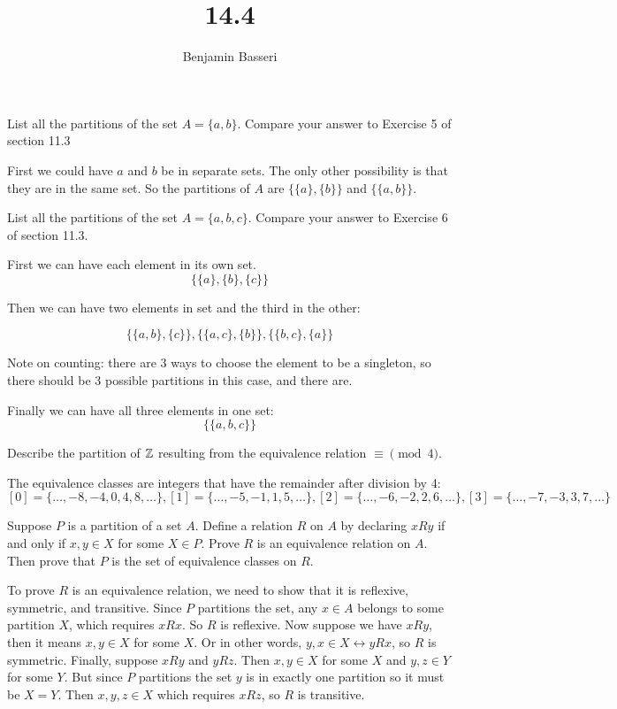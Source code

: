 \documentclass{article}
\title{14.4}
\author{Benjamin Basseri}
\date{} %
\begin{document}
\maketitle

\begin{problem}
List all the partitions of the set $A = \{a, b\}$. Compare your answer to Exercise 5 of section 11.3
\end{problem}

First we could have $a$ and $b$ be in separate sets. The only other possibility is that they are in the same set. So the partitions of $A$ are $\{\{a\}, \{b\}\}$ and $\{\{a, b\}\}$.

\begin{problem}
List all the partitions of the set $A = \{a, b, c\}$. Compare your answer to Exercise 6 of section 11.3.
\end{problem}

First we can have each element in its own set.
$$\{\{a\}, \{b\}, \{c\}\}$$

Then we can have two elements in set and the third in the other:

$$\{\{a, b\}, \{c\}\}, \{\{a, c\}, \{b\}\}, \{\{b, c\}, \{a\}\}$$

Note on counting: there are 3 ways to choose the element to be a singleton, so there should be 3 possible partitions in this case, and there are.

Finally we can have all three elements in one set:
$$\{\{a, b, c\}\}$$

\begin{problem}
Describe the partition of $\mathbb{Z}$ resulting from the equivalence relation $\equiv \pmod{4}$.
\end{problem}

The equivalence classes are integers that have the remainder after division by 4:
$$[0] = \{\ldots, -8, -4, 0, 4, 8, \ldots\}, [1] = \{\ldots, -5, -1, 1, 5, \ldots\}, [2] = \{\ldots, -6, -2, 2, 6, \ldots\}, [3] = \{\ldots, -7, -3, 3, 7, \ldots\}$$

\begin{problem}
Suppose $P$ is a partition of a set $A$. Define a relation $R$ on $A$ by declaring $xRy$ if and only if $x, y \in X$ for some $X \in P$. Prove $R$ is an equivalence relation on $A$. Then prove that $P$ is the set of equivalence classes on $R$.
\end{problem}

To prove $R$ is an equivalence relation, we need to show that it is reflexive, symmetric, and transitive. Since $P$ partitions the set, any $x \in A$ belongs to some partition $X$, which requires $xRx$. So $R$ is reflexive. Now suppose we have $xRy$, then it means $x, y \in X$ for some $X$. Or in other words, $y, x \in X \leftrightarrow yRx$, so $R$ is symmetric. Finally, suppose $xRy$ and $yRz$. Then $x, y \in X$ for some $X$ and $y, z \in Y$ for some $Y$. But since $P$ partitions the set $y$ is in exactly one partition so it must be $X = Y$. Then $x, y, z \in X$ which requires $xRz$, so $R$ is transitive.
\end{document}
